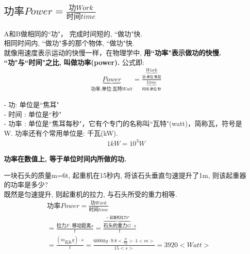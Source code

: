 \documentclass[UTF8]{ctexart}
\begin{document}
	
	
\subsection{$\text{功率}Power=\frac{\text{功}Work}{\text{时间}time}$ }	

A和B做相同的``功"， 完成时间短的, ``做功"快. \\
相同时间内, ``做功"多的那个物体, ``做功"快. \\
	
就像用速度表示运动的快慢一样，在物理学中, \textbf{用``功率"表示做功的快慢. ``功"与``时间"之比, 叫做功率(power).} 公式即:
\begin{align}
	\boxed{
	\underset{\text{功率,单位:瓦特}Watt}{\underbrace{Power}}=\frac{\underset{\text{功,单位:焦耳}}{\underbrace{Work}}}{\underset{\text{时间,单位:秒}}{\underbrace{time}}}		
	}
\end{align}

- 功: 单位是``焦耳" \\
- 时间 : 单位是``秒" \\
- 功率 : 单位是``焦耳每秒"，它有个专门的名称叫``瓦特"(watt)，简称瓦，符号是W. 功率还有个常用单位是: 千瓦(kW). \\
\begin{align*}
	\boxed{
	1kW = 10^3 W
	}
\end{align*}

\textbf{功率在数值上, 等于单位时间内所做的功.}



\begin{tcolorbox}[title = {例},boxrule={0.1em},colframe={black!10}, colback={black!3},colbacktitle={black!10},coltitle={black}]
	一块石头的质量m=6t, 起重机在15秒内, 将该石头垂直匀速提升了1m, 则该起重器的功率是多少? \\
	
	既然是匀速提升, 则起重机的拉力, 与石头所受的重力相等.	
	\begin{align*}
			&\text{功率}Power=\frac{\text{功}Work}{\text{时间}time}\\
		&=\frac{\text{拉力}F\cdot \text{移动距离}s}{t}=\frac{\overset{=\text{起重机拉力}F}{\overbrace{\text{石头的重力}G}}\cdot s}{t}\\
		&=\frac{\left( m_{\text{石头}}g \right) \cdot s}{t}=\frac{6000kg\cdot 9.8<\frac{N}{kg}>\cdot 1<m>}{15<s>}=3920<Watt>\\		
	\end{align*}
\end{tcolorbox}
\end{document}
